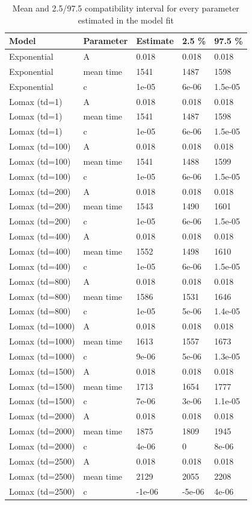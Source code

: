 \documentclass[11pt]{article}
\begin{document}
\begin{table}[H]

\caption{\label{tab:tableS2} Mean and 2.5/97.5 compatibility interval for every parameter estimated in the model fit}
\centering
\begin{tabular}[t]{l|l|l|l|l}
\hline
Model & Parameter & Estimate & 2.5 \% & 97.5 \%\\
\hline
Exponential & A & 0.018 & 0.018 & 0.018\\
\hline
Exponential & mean time & 1541 & 1487 & 1598\\
\hline
Exponential & c & 1e-05 & 6e-06 & 1.5e-05\\
\hline
Lomax (td=1) & A & 0.018 & 0.018 & 0.018\\
\hline
Lomax (td=1) & mean time & 1541 & 1487 & 1598\\
\hline
Lomax (td=1) & c & 1e-05 & 6e-06 & 1.5e-05\\
\hline
Lomax (td=100) & A & 0.018 & 0.018 & 0.018\\
\hline
Lomax (td=100) & mean time & 1541 & 1488 & 1599\\
\hline
Lomax (td=100) & c & 1e-05 & 6e-06 & 1.5e-05\\
\hline
Lomax (td=200) & A & 0.018 & 0.018 & 0.018\\
\hline
Lomax (td=200) & mean time & 1543 & 1490 & 1601\\
\hline
Lomax (td=200) & c & 1e-05 & 6e-06 & 1.5e-05\\
\hline
Lomax (td=400) & A & 0.018 & 0.018 & 0.018\\
\hline
Lomax (td=400) & mean time & 1552 & 1498 & 1610\\
\hline
Lomax (td=400) & c & 1e-05 & 6e-06 & 1.5e-05\\
\hline
Lomax (td=800) & A & 0.018 & 0.018 & 0.018\\
\hline
Lomax (td=800) & mean time & 1586 & 1531 & 1646\\
\hline
Lomax (td=800) & c & 1e-05 & 5e-06 & 1.4e-05\\
\hline
Lomax (td=1000) & A & 0.018 & 0.018 & 0.018\\
\hline
Lomax (td=1000) & mean time & 1613 & 1557 & 1673\\
\hline
Lomax (td=1000) & c & 9e-06 & 5e-06 & 1.3e-05\\
\hline
Lomax (td=1500) & A & 0.018 & 0.018 & 0.018\\
\hline
Lomax (td=1500) & mean time & 1713 & 1654 & 1777\\
\hline
Lomax (td=1500) & c & 7e-06 & 3e-06 & 1.1e-05\\
\hline
Lomax (td=2000) & A & 0.018 & 0.018 & 0.018\\
\hline
Lomax (td=2000) & mean time & 1875 & 1809 & 1945\\
\hline
Lomax (td=2000) & c & 4e-06 & 0 & 8e-06\\
\hline
Lomax (td=2500) & A & 0.018 & 0.018 & 0.018\\
\hline
Lomax (td=2500) & mean time & 2129 & 2055 & 2208\\
\hline
Lomax (td=2500) & c & -1e-06 & -5e-06 & 4e-06\\
\hline
\end{tabular}
\end{table}
\end{document}

